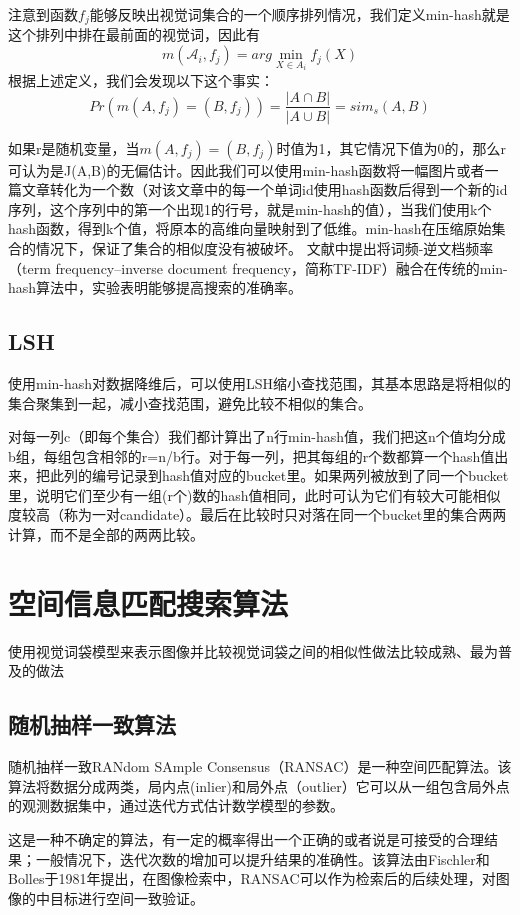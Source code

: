 注意到函数\(f_j\)能够反映出视觉词集合的一个顺序排列情况，我们定义min-hash就是这个排列中排在最前面的视觉词，因此有
\[m(\mathcal{A}_i,f_j)= arg\mathop {\min }\limits_{X \in A_i}f_j(X)\]
根据上述定义，我们会发现以下这个事实：
\[Pr(m(A,f_j) = (B,f_j)) = \frac{|A\cap{B}|}{|A\cup{B}|} = sim_s(A,B)\]

如果r是随机变量，当\(m(A,f_j) = (B,f_j)\)时值为1，其它情况下值为0的，那么r可认为是J(A,B)的无偏估计。因此我们可以使用min-hash函数将一幅图片或者一篇文章转化为一个数（对该文章中的每一个单词id使用hash函数后得到一个新的id序列，这个序列中的第一个出现1的行号，就是min-hash的值），当我们使用k个hash函数，得到k个值，将原本的高维向量映射到了低维。min-hash在压缩原始集合的情况下，保证了集合的相似度没有被破坏。
文献\cite{Chum:2008jo}中提出将词频-逆文档频率（term frequency–inverse document frequency，简称TF-IDF）融合在传统的min-hash算法中，实验表明能够提高搜索的准确率。

\subsection{LSH}
使用min-hash对数据降维后，可以使用LSH缩小查找范围，其基本思路是将相似的集合聚集到一起，减小查找范围，避免比较不相似的集合。

对每一列c（即每个集合）我们都计算出了n行min-hash值，我们把这n个值均分成b组，每组包含相邻的r=n/b行。对于每一列，把其每组的r个数都算一个hash值出来，把此列的编号记录到hash值对应的bucket里。如果两列被放到了同一个bucket里，说明它们至少有一组(r个)数的hash值相同，此时可认为它们有较大可能相似度较高（称为一对candidate）。最后在比较时只对落在同一个bucket里的集合两两计算，而不是全部的两两比较。

\section{空间信息匹配搜索算法}
使用视觉词袋模型来表示图像并比较视觉词袋之间的相似性做法比较成熟、最为普及的做法
\subsection{随机抽样一致算法}
随机抽样一致RANdom SAmple Consensus（RANSAC）是一种空间匹配算法。该算法将数据分成两类，局内点(inlier)和局外点（outlier）它可以从一组包含局外点的观测数据集中，通过迭代方式估计数学模型的参数。

这是一种不确定的算法，有一定的概率得出一个正确的或者说是可接受的合理结果；一般情况下，迭代次数的增加可以提升结果的准确性。该算法由Fischler和Bolles于1981年提出，在图像检索中，RANSAC可以作为检索后的后续处理，对图像的中目标进行空间一致验证。


